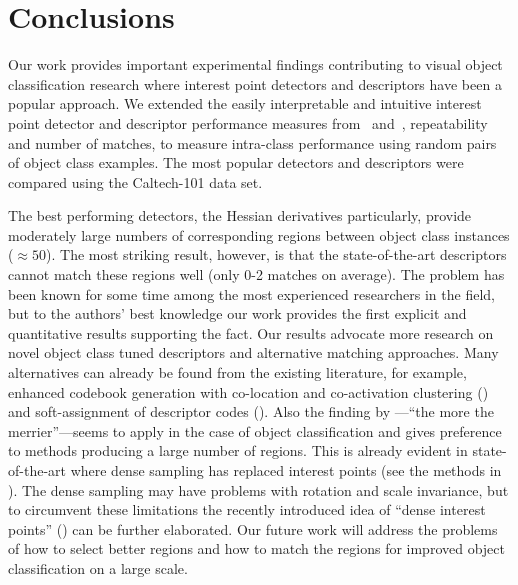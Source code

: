 \documentclass[preprint,authoryear,review]{elsarticle}
\begin{document}
\section{Conclusions}
%
Our work provides important experimental findings contributing to
visual object classification research where interest point detectors
and descriptors have been a popular approach. We extended the easily
interpretable and intuitive interest point detector and descriptor
performance measures from~\cite{MikTuySch:2005} and~\cite{MikSch:2005},
repeatability and number of matches, to measure intra-class performance
using random pairs of object class examples. The most popular
detectors and descriptors were compared using the Caltech-101 data set.

The best performing detectors, the Hessian derivatives particularly,
provide moderately large numbers of corresponding regions between object
class instances ($\approx50$). The most striking result, however, is
that the state-of-the-art descriptors cannot match these regions well (only
0-2 matches on average). The problem has been known for some time among
the most experienced researchers in the field,  but to the authors' best
knowledge our work provides the first explicit and quantitative results
supporting the fact. Our
results advocate more research on novel object class tuned descriptors and
alternative matching approaches. Many alternatives can already be found
from the existing literature, for example, enhanced codebook generation
with co-location and co-activation clustering (\cite{LeiEttSch:2008}) and
soft-assignment of descriptor codes (\cite{AgaTri:2008,TuySch:2007}).
Also the finding by \cite{NowJurTri:2006}---``the more the
merrier''---seems to apply in the case of object classification and gives
preference
to methods producing a large number of regions. This is already evident
in state-of-the-art where dense sampling has replaced interest points
(see the methods in \cite{pascal-voc-2012}). The dense sampling may have
problems with rotation and scale invariance, but to circumvent these
limitations the recently introduced idea of ``dense interest points''
(\cite{Tuy:2010}) can be further elaborated. Our future work will address
the problems of how to select better regions and how to match the
regions for improved object classification on a large scale.

\end{document}
